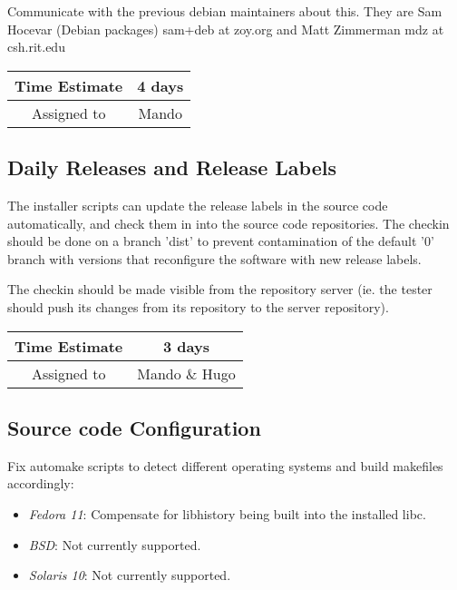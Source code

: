 \documentclass[12pt]{article}
\begin{document}
Communicate with the previous debian maintainers about this.  They are
Sam Hocevar (Debian packages) sam+deb at zoy.org and Matt Zimmerman
mdz at csh.rit.edu

\begin{center}
  \vspace{5mm}
  \centering
  \begin{tabular}{|c|c|}
    \hline
    Time Estimate
    & 4 days \\
    \hline
    Assigned to
    & Mando \\
    \hline
  \end{tabular}
\end{center}


\subsection{Daily Releases and Release Labels}

The installer scripts can update the release labels in the source code
automatically, and check them in into the source code repositories.
The checkin should be done on a branch 'dist' to prevent contamination
of the default '0' branch with versions that reconfigure the software
with new release labels.

The checkin should be made visible from the repository server (ie. the
tester should push its changes from its repository to the server
repository).

\begin{center}
  \vspace{5mm}
  \centering
  \begin{tabular}{|c|c|}
    \hline
    Time Estimate
    & 3 days \\
    \hline
    Assigned to
    & Mando \& Hugo \\
    \hline
  \end{tabular}
\end{center}


\subsection{Source code Configuration}

Fix automake scripts to detect different operating systems 
and build makefiles accordingly:


\begin{itemize}
\item {\it Fedora 11}: Compensate for libhistory being built into the
  installed libc.
\item {\it BSD}: Not currently supported.
\item {\it Solaris 10}: Not currently supported.
\end{itemize}
\end{document}
